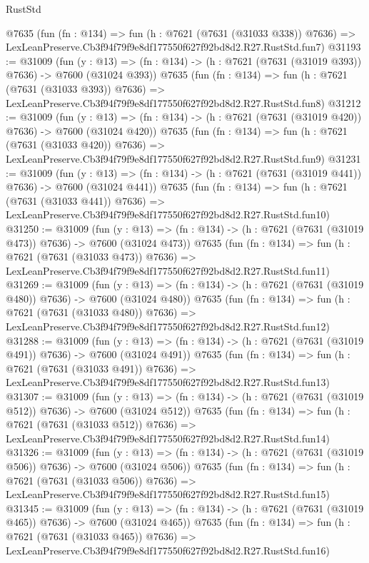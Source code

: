 \begin{lexlean}{RustStd}
\begin{coremodule}
    @7635
    (fun (fn : @134) =>
    fun (h : @7621 (@7631 (@31033 @338)) @7636) =>
    LexLeanPreserve.Cb3f94f79f9e8df177550f627f92bd8d2.R27.RustStd.fun7)
@31193 := @31009
    (fun (y : @13) => (fn : @134) -> (h : @7621 (@7631 (@31019 @393)) @7636) -> @7600 (@31024 @393))
    @7635
    (fun (fn : @134) =>
    fun (h : @7621 (@7631 (@31033 @393)) @7636) =>
    LexLeanPreserve.Cb3f94f79f9e8df177550f627f92bd8d2.R27.RustStd.fun8)
@31212 := @31009
    (fun (y : @13) => (fn : @134) -> (h : @7621 (@7631 (@31019 @420)) @7636) -> @7600 (@31024 @420))
    @7635
    (fun (fn : @134) =>
    fun (h : @7621 (@7631 (@31033 @420)) @7636) =>
    LexLeanPreserve.Cb3f94f79f9e8df177550f627f92bd8d2.R27.RustStd.fun9)
@31231 := @31009
    (fun (y : @13) => (fn : @134) -> (h : @7621 (@7631 (@31019 @441)) @7636) -> @7600 (@31024 @441))
    @7635
    (fun (fn : @134) =>
    fun (h : @7621 (@7631 (@31033 @441)) @7636) =>
    LexLeanPreserve.Cb3f94f79f9e8df177550f627f92bd8d2.R27.RustStd.fun10)
@31250 := @31009
    (fun (y : @13) => (fn : @134) -> (h : @7621 (@7631 (@31019 @473)) @7636) -> @7600 (@31024 @473))
    @7635
    (fun (fn : @134) =>
    fun (h : @7621 (@7631 (@31033 @473)) @7636) =>
    LexLeanPreserve.Cb3f94f79f9e8df177550f627f92bd8d2.R27.RustStd.fun11)
@31269 := @31009
    (fun (y : @13) => (fn : @134) -> (h : @7621 (@7631 (@31019 @480)) @7636) -> @7600 (@31024 @480))
    @7635
    (fun (fn : @134) =>
    fun (h : @7621 (@7631 (@31033 @480)) @7636) =>
    LexLeanPreserve.Cb3f94f79f9e8df177550f627f92bd8d2.R27.RustStd.fun12)
@31288 := @31009
    (fun (y : @13) => (fn : @134) -> (h : @7621 (@7631 (@31019 @491)) @7636) -> @7600 (@31024 @491))
    @7635
    (fun (fn : @134) =>
    fun (h : @7621 (@7631 (@31033 @491)) @7636) =>
    LexLeanPreserve.Cb3f94f79f9e8df177550f627f92bd8d2.R27.RustStd.fun13)
@31307 := @31009
    (fun (y : @13) => (fn : @134) -> (h : @7621 (@7631 (@31019 @512)) @7636) -> @7600 (@31024 @512))
    @7635
    (fun (fn : @134) =>
    fun (h : @7621 (@7631 (@31033 @512)) @7636) =>
    LexLeanPreserve.Cb3f94f79f9e8df177550f627f92bd8d2.R27.RustStd.fun14)
@31326 := @31009
    (fun (y : @13) => (fn : @134) -> (h : @7621 (@7631 (@31019 @506)) @7636) -> @7600 (@31024 @506))
    @7635
    (fun (fn : @134) =>
    fun (h : @7621 (@7631 (@31033 @506)) @7636) =>
    LexLeanPreserve.Cb3f94f79f9e8df177550f627f92bd8d2.R27.RustStd.fun15)
@31345 := @31009
    (fun (y : @13) => (fn : @134) -> (h : @7621 (@7631 (@31019 @465)) @7636) -> @7600 (@31024 @465))
    @7635
    (fun (fn : @134) =>
    fun (h : @7621 (@7631 (@31033 @465)) @7636) =>
    LexLeanPreserve.Cb3f94f79f9e8df177550f627f92bd8d2.R27.RustStd.fun16)

\end{coremodule}
\end{lexlean}
